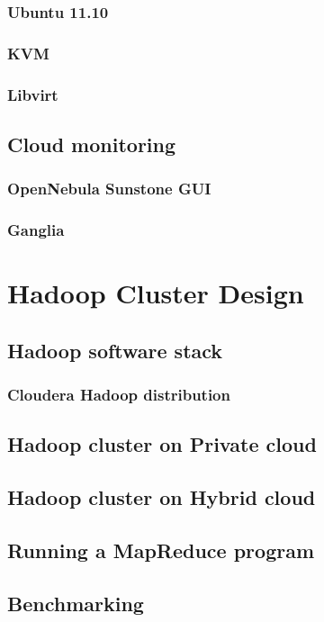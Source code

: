 \documentclass[12pt,a4paper]{report}
\begin{document}
\subsection{Ubuntu 11.10}
\subsection{KVM}
\subsection{Libvirt}

\section{Cloud monitoring}
\subsection{OpenNebula Sunstone GUI}
\subsection{Ganglia}

\chapter{Hadoop Cluster Design}

\section{Hadoop software stack}
\subsection{Cloudera Hadoop distribution}
\section{Hadoop cluster on Private cloud}
\section{Hadoop cluster on Hybrid cloud}
\section{Running a MapReduce program}
\section{Benchmarking}
\end{document}
